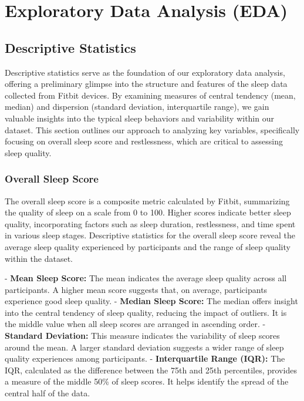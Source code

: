 \documentclass[10pt]{extarticle}
\begin{document}
\section{Exploratory Data Analysis (EDA)}

\subsection{Descriptive Statistics}

Descriptive statistics serve as the foundation of our exploratory data analysis, offering a preliminary glimpse into the structure and features of the sleep data collected from Fitbit devices. By examining measures of central tendency (mean, median) and dispersion (standard deviation, interquartile range), we gain valuable insights into the typical sleep behaviors and variability within our dataset. This section outlines our approach to analyzing key variables, specifically focusing on overall sleep score and restlessness, which are critical to assessing sleep quality.

\subsubsection{Overall Sleep Score}

The overall sleep score is a composite metric calculated by Fitbit, summarizing the quality of sleep on a scale from 0 to 100. Higher scores indicate better sleep quality, incorporating factors such as sleep duration, restlessness, and time spent in various sleep stages. Descriptive statistics for the overall sleep score reveal the average sleep quality experienced by participants and the range of sleep quality within the dataset.

- \textbf{Mean Sleep Score:} The mean indicates the average sleep quality across all participants. A higher mean score suggests that, on average, participants experience good sleep quality.
- \textbf{Median Sleep Score:} The median offers insight into the central tendency of sleep quality, reducing the impact of outliers. It is the middle value when all sleep scores are arranged in ascending order.
- \textbf{Standard Deviation:} This measure indicates the variability of sleep scores around the mean. A larger standard deviation suggests a wider range of sleep quality experiences among participants.
- \textbf{Interquartile Range (IQR):} The IQR, calculated as the difference between the 75th and 25th percentiles, provides a measure of the middle 50\% of sleep scores. It helps identify the spread of the central half of the data.
\end{document}
